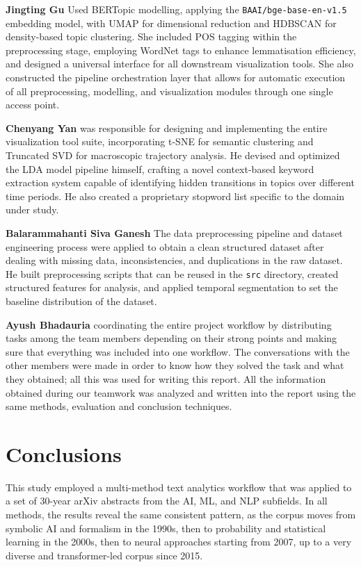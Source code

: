 \documentclass{article}
\begin{document}
\textbf{Jingting Gu} Used BERTopic modelling, applying
the \texttt{BAAI/bge-base-en-v1.5} embedding model,
with UMAP for dimensional reduction and HDBSCAN for density-based topic clustering.
She included POS tagging within the preprocessing stage, employing WordNet tags to enhance
lemmatisation efficiency, and designed a universal interface for all downstream visualization tools.
She also constructed the pipeline orchestration layer that allows for automatic execution of all
preprocessing, modelling, and visualization modules through one single access point.

\textbf{Chenyang Yan} was responsible for designing and implementing the entire
visualization tool suite, incorporating t-SNE for semantic clustering and Truncated SVD for macroscopic trajectory analysis. He devised and optimized the LDA model pipeline himself, crafting a novel context-based keyword extraction system capable of identifying hidden transitions in topics over different time periods. He also created a proprietary stopword list specific to the domain under study.

\textbf{Balarammahanti Siva Ganesh} The data preprocessing pipeline and dataset engineering
process were applied to obtain a clean structured
dataset after dealing with missing data, inconsistencies,
and duplications in the raw dataset. He built
preprocessing scripts that can be reused in the
\texttt{src} directory, created structured features for
analysis, and applied temporal segmentation to set the
baseline distribution of the dataset.

\textbf{Ayush Bhadauria} coordinating the entire project
workflow by distributing tasks among the team members
depending on their strong points and making sure
that everything was included into one workflow.
The conversations with the other members were made in
order to know how they solved the task and what they
obtained; all this was used for writing this report.
All the information obtained during our teamwork was
analyzed and written into the report using the same
methods, evaluation and conclusion techniques.


\section{Conclusions}
\label{sec:conclusions}

This study employed a multi-method text analytics workflow that was
applied to a set of 30-year arXiv abstracts from the AI, ML, and NLP subfields.
In all methods, the results reveal the same consistent pattern, as the corpus moves
from symbolic AI and formalism in the 1990s, then to probability and statistical
learning in the 2000s, then to neural approaches starting from 2007, up to a very
diverse and transformer-led corpus since 2015.
\end{document}
